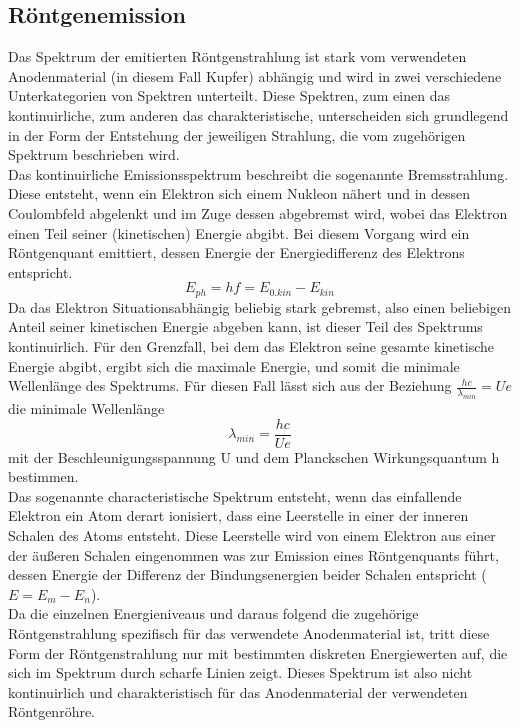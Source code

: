 \subsection{Röntgenemission}
Das Spektrum der emitierten Röntgenstrahlung ist stark vom verwendeten Anodenmaterial (in diesem Fall Kupfer) abhängig und wird in zwei verschiedene Unterkategorien von Spektren unterteilt. Diese Spektren, zum einen das kontinuirliche, zum anderen das charakteristische, unterscheiden sich grundlegend in der Form der Entstehung der jeweiligen Strahlung, die vom zugehörigen Spektrum beschrieben wird. \\
Das kontinuirliche Emissionsspektrum beschreibt die sogenannte Bremsstrahlung. Diese entsteht, wenn ein Elektron sich einem Nukleon nähert und in dessen Coulombfeld abgelenkt und im Zuge dessen abgebremst wird, wobei das Elektron einen Teil seiner (kinetischen) Energie abgibt. Bei diesem Vorgang wird ein Röntgenquant emittiert, dessen Energie der Energiedifferenz des Elektrons entspricht.
\begin{equation}
E_{ph}=hf=E_{0.kin}-E_{kin}
\end{equation}
Da das Elektron Situationsabhängig beliebig stark gebremst, also einen beliebigen Anteil seiner kinetischen Energie abgeben kann, ist dieser Teil des Spektrums kontinuirlich. Für den Grenzfall, bei dem das Elektron seine gesamte kinetische Energie abgibt, ergibt sich die maximale Energie, und somit die minimale Wellenlänge des Spektrums. Für diesen Fall lässt sich aus der Beziehung $\frac{hc}{\lambda_{min}}=Ue$ die minimale Wellenlänge
\begin{equation}
\lambda_{min}=\frac{hc}{Ue}
\end{equation}
mit der Beschleunigungsspannung U und dem Planckschen Wirkungsquantum h bestimmen. \\
Das sogenannte characteristische Spektrum entsteht, wenn das einfallende Elektron ein Atom derart ionisiert, dass eine Leerstelle in einer der inneren Schalen des Atoms entsteht. Diese Leerstelle wird von einem Elektron aus einer der äußeren Schalen eingenommen was zur Emission eines Röntgenquants führt, dessen Energie der Differenz der Bindungsenergien beider Schalen entspricht ($E=E_m-E_n$). \\
Da die einzelnen Energieniveaus und daraus folgend die zugehörige Röntgenstrahlung spezifisch für das verwendete Anodenmaterial ist, tritt diese Form der Röntgenstrahlung nur mit bestimmten diskreten Energiewerten auf, die sich im Spektrum durch scharfe Linien zeigt. Dieses Spektrum ist also nicht kontinuirlich und charakteristisch für das Anodenmaterial der verwendeten Röntgenröhre. \\
